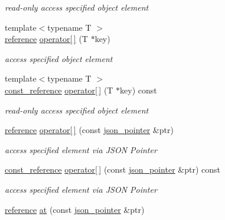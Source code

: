 \begin{DoxyCompactItemize}
\begin{DoxyCompactList}\small\item\em read-\/only access specified object element \end{DoxyCompactList}\item 
{\footnotesize template$<$typename T $>$ }\\\hyperlink{classnlohmann_1_1basic__json_a3ec8e17be8732fe436e9d6733f52b7a3}{reference} \hyperlink{classnlohmann_1_1basic__json_ac7c006e2345a76859c4802db7d130e0e}{operator\mbox{[}$\,$\mbox{]}} (T $\ast$key)
\begin{DoxyCompactList}\small\item\em access specified object element \end{DoxyCompactList}\item 
{\footnotesize template$<$typename T $>$ }\\\hyperlink{classnlohmann_1_1basic__json_af677a29b0e66edc9f66e5167e4667071}{const\-\_\-reference} \hyperlink{classnlohmann_1_1basic__json_aa6fd72df1ce9f80e61012784c598456e}{operator\mbox{[}$\,$\mbox{]}} (T $\ast$key) const 
\begin{DoxyCompactList}\small\item\em read-\/only access specified object element \end{DoxyCompactList}\item 
\hyperlink{classnlohmann_1_1basic__json_a3ec8e17be8732fe436e9d6733f52b7a3}{reference} \hyperlink{classnlohmann_1_1basic__json_a7605b20debcc12fc44bd9f2075122a87}{operator\mbox{[}$\,$\mbox{]}} (const \hyperlink{classnlohmann_1_1basic__json_1_1json__pointer}{json\-\_\-pointer} \&ptr)
\begin{DoxyCompactList}\small\item\em access specified element via J\-S\-O\-N Pointer \end{DoxyCompactList}\item 
\hyperlink{classnlohmann_1_1basic__json_af677a29b0e66edc9f66e5167e4667071}{const\-\_\-reference} \hyperlink{classnlohmann_1_1basic__json_a76347b37f07c75049f5164053a6cf81a}{operator\mbox{[}$\,$\mbox{]}} (const \hyperlink{classnlohmann_1_1basic__json_1_1json__pointer}{json\-\_\-pointer} \&ptr) const 
\begin{DoxyCompactList}\small\item\em access specified element via J\-S\-O\-N Pointer \end{DoxyCompactList}\item 
\hyperlink{classnlohmann_1_1basic__json_a3ec8e17be8732fe436e9d6733f52b7a3}{reference} \hyperlink{classnlohmann_1_1basic__json_a649aef71e5d952499da7ad3b8e7c9236}{at} (const \hyperlink{classnlohmann_1_1basic__json_1_1json__pointer}{json\-\_\-pointer} \&ptr)

\end{DoxyCompactItemize}
